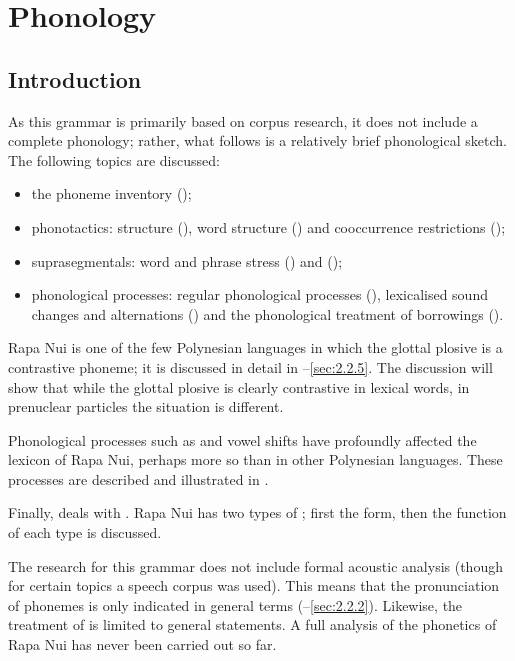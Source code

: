 \chapter{Phonology}\label{ch:2}
\section{Introduction}\label{sec:2.1}

As this grammar is primarily based on corpus research, it does not include a complete phonology; rather, what follows is a relatively brief phonological sketch. The following topics are discussed: 

\begin{itemize}
\item 
the phoneme inventory ();

\item 
phonotactics:  structure (), word structure () and cooccurrence restrictions ();

\item 
suprasegmentals: word and phrase stress () and  ();

\item 
phonological processes: regular phonological processes (), lexicalised sound changes and alternations () and the phonological treatment of borrowings ().

\end{itemize}

Rapa Nui is one of the few Polynesian languages in which the glottal plosive is a contrastive phoneme; it is discussed in detail in –\ref{sec:2.2.5}. The discussion will show that while the glottal plosive is clearly contrastive in lexical words, in prenuclear particles the situation is different.

Phonological processes such as  and vowel shifts have profoundly affected the lexicon of Rapa Nui, perhaps more so than in other Polynesian languages. These processes are described and illustrated in .

Finally,  deals with . Rapa Nui has two types of ; first the form, then the function of each type is discussed.

The research for this grammar does not include formal acoustic analysis (though for certain topics a speech corpus was used). This means that the pronunciation of phonemes is only indicated in general terms (–\ref{sec:2.2.2}). Likewise, the treatment of  is limited to general statements. A full analysis of the phonetics of Rapa Nui has never been carried out so far.

